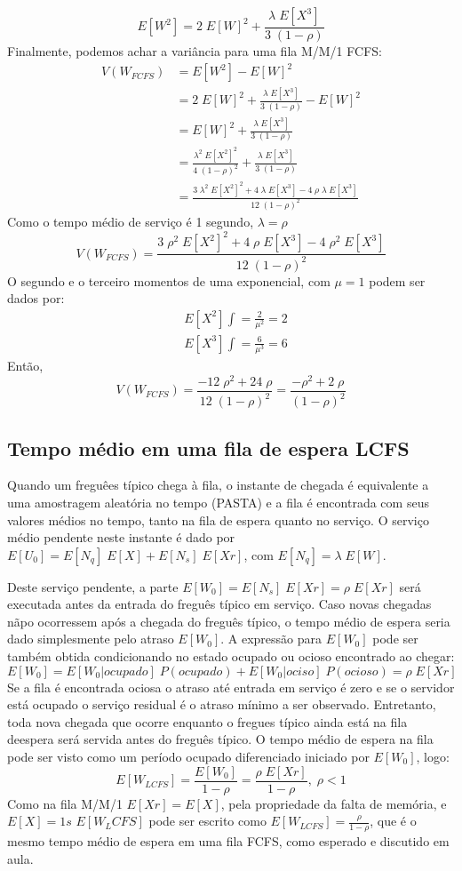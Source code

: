 \documentclass[a4paper]{article}
\newcommand{\E}[1]{E\!\left[#1\right]}
\begin{document}
\[
    \E{W^2}
    = 2 \; \E{W}^2 + \frac{\lambda \; \E{X^3}}{3 \; (1 - \rho)}
\]
Finalmente, podemos achar a variância para uma fila M/M/1 FCFS:
\begin{align*}
    V(W_{FCFS}) &= \E{W^2} - \E{W}^2 \\
    &= 2 \; \E{W}^2 + \frac{\lambda \; \E{X^3}}{3 \; (1 - \rho)}
        - \E{W}^2 \\
    &= \E{W}^2 + \frac{\lambda \; \E{X^3}}{3 \; (1 - \rho)} \\
    &= \frac{\lambda^2 \; \E{X^2}^2}{4 \; (1 - \rho)^2}
        + \frac{\lambda \; \E{X^3}}{3 \; (1 - \rho)} \\
    &= \frac{3 \; \lambda^2 \; \E{X^2}^2 + 4 \; \lambda \; \E{X^3}
        - 4 \; \rho \; \lambda \; \E{X^3}}{12 \; (1 - \rho)^2}
    \end{align*}
Como o tempo médio de serviço é 1 segundo, \(\lambda = \rho\)
\[
    V(W_{FCFS}) = \frac{3 \; \rho^2 \; \E{X^2}^2
        + 4 \; \rho \; \E{X^3} - 4 \; \rho^2 \; \E{X^3}}{12
        \; (1 - \rho)^2}
\]
O segundo e o terceiro momentos de uma exponencial,
com \(\mu = 1\) podem ser dados por:
\begin{align*}
    &\E{X^2} \int = \frac{2}{\mu^2 } = 2 \\
    &\E{X^3} \int = \frac{6}{\mu^3 } = 6
\end{align*}
Então,
\[
    V(W_{FCFS})
    = \frac{-12 \; \rho^2 + 24 \; \rho}{12 \; (1 - \rho)^2} = \frac{-\rho^2 + 2 \; \rho}{(1 - \rho)^2}
\]
\subsection{Tempo médio em uma fila de espera LCFS}
Quando um freguêes típico chega à fila, o instante de chegada
é equivalente a uma amostragem aleatória no tempo (PASTA)
e a fila  é encontrada com seus valores médios no tempo,
tanto na fila de espera quanto no serviço.
O serviço médio pendente neste instante  é dado
por \(\E{U_0} = \E{N_q}\;\E{X} + \E{N_s}\;\E{Xr}\), com \(\E{N_q} = \lambda\;\E{W}\).

Deste serviço pendente, a parte \(\E{W_0} = \E{N_s}\;\E{Xr} = \rho\;\E{Xr}\)
será executada antes da entrada do freguês típico em serviço.
Caso novas chegadas nãpo ocorressem após a chegada
do freguês típico, o tempo médio de espera seria dado simplesmente
pelo atraso \(\E{W_0}\). A expressão para \(\E{W_0}\) pode ser também
obtida condicionando no estado ocupado ou ocioso
encontrado ao chegar:
\[
    \E{W_0} = \E{W_0|ocupado} \; P(ocupado) + \E{W_0|ociso} \; P(ocioso) = \rho\;\E{Xr}
\]
Se a fila é encontrada ociosa o atraso até entrada em serviço é zero e se o servidor
está ocupado o serviço residual é o atraso mínimo a ser observado.
Entretanto, toda nova chegada que ocorre enquanto o fregues típico
ainda está na fila deespera será servida antes do freguês típico.
O tempo médio de espera na fila pode ser visto
como um período ocupado diferenciado iniciado por \(\E{W_0}\), logo:
\[
    \E{W_{LCFS}} = \frac{ \E{W_0}}{ 1-\rho} = \frac{ \rho\;\E{Xr}}{ 1-\rho},\;\rho < 1
\]
Como na fila M/M/1 \(\E{Xr} = \E{X}\), pela propriedade da falta de memória, e  \(\E{X} =1s\)
\(\E{W_LCFS}\) pode ser escrito como
\(\E{W_{LCFS}} = \frac{\rho}{1 - \rho}\), que
é o mesmo tempo médio de espera em uma fila FCFS, como esperado e discutido em aula.
\end{document}
